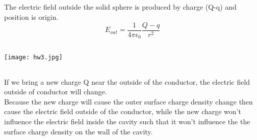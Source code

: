 \documentclass[10.5pt]{article}
\begin{document}
\subsection{}
The electric field outside the solid sphere is produced by charge (Q-q) and position is origin.$$E_{out} = \frac{1}{4\pi\epsilon_0} \frac{Q-q}{r^2}$$

\subsection{}
\texttt{[image: hw3.jpg]}

\subsection{}
If we bring a new charge Q near the outside of the conductor, the electric field outside of conductor will change.\\\indent 
Because the new charge will cause the outer surface charge density change then cause the electric field outside of the conductor, while the new charge won't influence the electric field inside the cavity such that it won't influence the the surface charge density on the wall of the cavity.

\section{}
\end{document}
